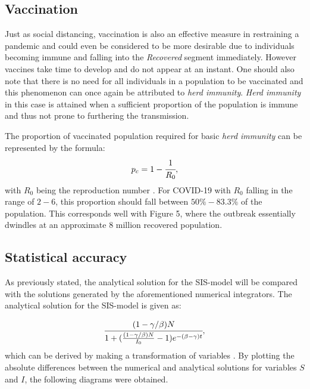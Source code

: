 \documentclass[12pt]{article}
\begin{document}
\subsection{Vaccination}
Just as social distancing, vaccination is also an effective measure in restraining 
a pandemic and could even be considered to be more desirable due to individuals becoming 
immune and falling into the \textit{Recovered} segment immediately. However vaccines take 
time to develop and do not appear at an instant. One should also note that there is no 
need for all individuals in a population to be vaccinated and this phenomenon can once again 
be attributed to \textit{herd immunity}. \textit{Herd immunity} in this case is attained when 
a sufficient proportion of the population is immune and thus not prone to furthering 
the transmission.

The proportion of vaccinated population required for basic
\textit{herd immunity} can be represented by the formula: 
\begin{equation}
p_c = 1- \cfrac{1}{R_0},
\end{equation}
with $R_0$ being the reproduction number \cite{ashraf}. For COVID-19 with $R_0$ 
falling in the range of $2-6$, this proportion should fall between $50 \% - 83.3 \%$ 
of the population. This corresponds well with Figure 5, where the 
outbreak essentially dwindles at an approximate $8$ million recovered population. 
\newpage 
\subsection{Statistical accuracy}
As previously stated, the analytical solution for the SIS-model will be 
compared with the solutions generated by the aforementioned numerical integrators. 
The analytical solution for the SIS-model is given as:

\begin{equation}
\cfrac{(1-\gamma/\beta)N}{1+(\frac{(1-\gamma/\beta)N}{I_0}-1)
e^{-(\beta-\gamma)t}},  
\end{equation}
which can be derived by making a transformation of variables \cite{levin}.
By plotting the absolute differences between the numerical and analytical 
solutions for variables $S$ and $I$, the following diagrams were obtained.
\end{document}
